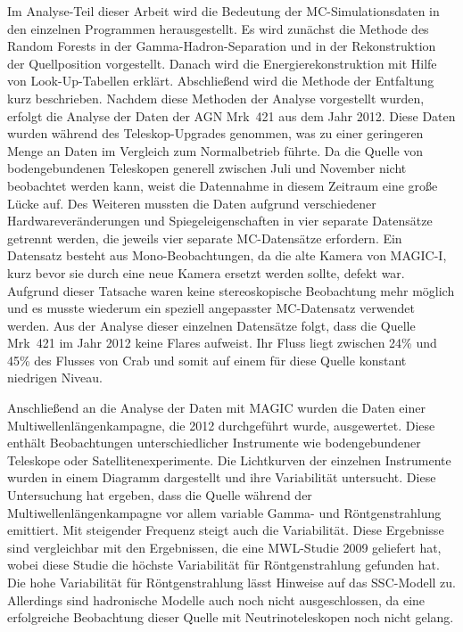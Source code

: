 Im Analyse-Teil dieser Arbeit wird die Bedeutung der MC-Simulationsdaten in den einzelnen Programmen herausgestellt.
Es wird zunächst die Methode des Random Forests in der Gamma-Hadron-Separation und in der Rekonstruktion der Quellposition vorgestellt.
Danach wird die Energierekonstruktion mit Hilfe von Look-Up-Tabellen erklärt.
Abschließend wird die Methode der Entfaltung kurz beschrieben.
Nachdem diese Methoden der Analyse vorgestellt wurden, erfolgt die Analyse der Daten der AGN Mrk~421 aus dem Jahr 2012.
Diese Daten wurden während des Teleskop-Upgrades genommen, was zu einer geringeren Menge an Daten im Vergleich zum Normalbetrieb führte.
Da die Quelle von bodengebundenen Teleskopen generell zwischen Juli und November nicht beobachtet werden kann, weist die Datennahme in diesem Zeitraum eine große Lücke auf. 
Des Weiteren mussten die Daten aufgrund verschiedener Hardwareveränderungen und Spiegeleigenschaften in vier separate Datensätze getrennt werden, die jeweils vier separate MC-Datensätze erfordern.
Ein Datensatz besteht aus Mono-Beobachtungen, da die alte Kamera von MAGIC-I, kurz bevor sie durch eine neue Kamera ersetzt werden sollte, defekt war.
Aufgrund dieser Tatsache waren keine stereoskopische Beobachtung mehr möglich und es musste wiederum ein speziell angepasster MC-Datensatz verwendet werden.
Aus der Analyse dieser einzelnen Datensätze folgt, dass die Quelle Mrk~421 im Jahr 2012 keine Flares aufweist.
Ihr Fluss liegt zwischen 24\% und 45\% des Flusses von Crab und somit auf einem für diese Quelle konstant niedrigen Niveau.

Anschließend an die Analyse der Daten mit MAGIC wurden die Daten einer Multiwellenlängenkampagne, die 2012 durchgeführt wurde, ausgewertet.
Diese enthält Beobachtungen unterschiedlicher Instrumente wie bodengebundener Teleskope oder Satellitenexperimente.
Die Lichtkurven der einzelnen Instrumente wurden in einem Diagramm dargestellt und ihre Variabilität untersucht.
Diese Untersuchung hat ergeben, dass die Quelle während der Multiwellenlängenkampagne vor allem variable Gamma- und Röntgenstrahlung emittiert.
Mit steigender Frequenz steigt auch die Variabilität.
Diese Ergebnisse sind vergleichbar mit den Ergebnissen, die eine MWL-Studie 2009 geliefert hat, wobei diese Studie die höchste Variabilität für Röntgenstrahlung gefunden hat.
Die hohe Variabilität für Röntgenstrahlung lässt Hinweise auf das SSC-Modell zu.
Allerdings sind hadronische Modelle auch noch nicht ausgeschlossen, da eine erfolgreiche Beobachtung dieser Quelle mit Neutrinoteleskopen noch nicht gelang.

